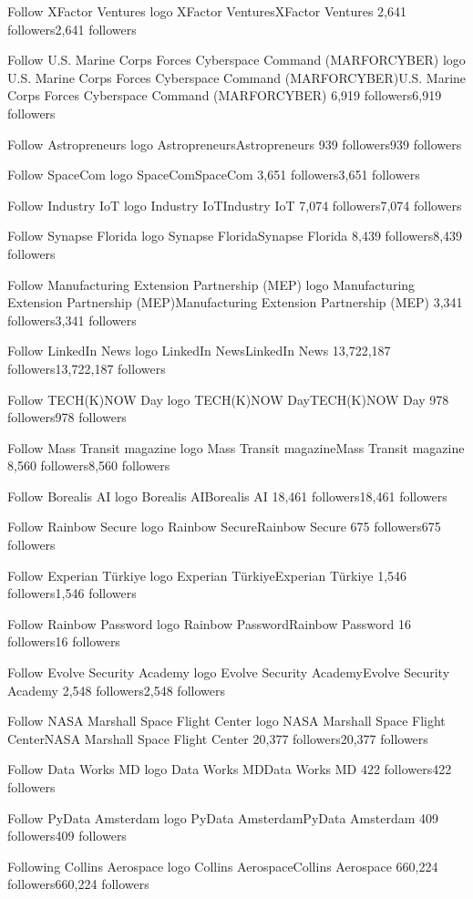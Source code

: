 Follow
XFactor Ventures logo
XFactor VenturesXFactor Ventures
2,641 followers2,641 followers

Follow
U.S. Marine Corps Forces Cyberspace Command (MARFORCYBER) logo
U.S. Marine Corps Forces Cyberspace Command (MARFORCYBER)U.S. Marine Corps Forces Cyberspace Command (MARFORCYBER)
6,919 followers6,919 followers

Follow
Astropreneurs logo
AstropreneursAstropreneurs
939 followers939 followers

Follow
SpaceCom logo
SpaceComSpaceCom
3,651 followers3,651 followers

Follow
Industry IoT logo
Industry IoTIndustry IoT
7,074 followers7,074 followers

Follow
Synapse Florida logo
Synapse FloridaSynapse Florida
8,439 followers8,439 followers

Follow
Manufacturing Extension Partnership (MEP) logo
Manufacturing Extension Partnership (MEP)Manufacturing Extension Partnership (MEP)
3,341 followers3,341 followers

Follow
LinkedIn News logo
LinkedIn NewsLinkedIn News
13,722,187 followers13,722,187 followers

Follow
TECH(K)NOW Day logo
TECH(K)NOW DayTECH(K)NOW Day
978 followers978 followers

Follow
Mass Transit magazine logo
Mass Transit magazineMass Transit magazine
8,560 followers8,560 followers

Follow
Borealis AI logo
Borealis AIBorealis AI
18,461 followers18,461 followers

Follow
Rainbow Secure logo
Rainbow SecureRainbow Secure
675 followers675 followers

Follow
Experian Türkiye logo
Experian TürkiyeExperian Türkiye
1,546 followers1,546 followers

Follow
Rainbow Password logo
Rainbow PasswordRainbow Password
16 followers16 followers

Follow
Evolve Security Academy logo
Evolve Security AcademyEvolve Security Academy
2,548 followers2,548 followers

Follow
NASA Marshall Space Flight Center logo
NASA Marshall Space Flight CenterNASA Marshall Space Flight Center
20,377 followers20,377 followers

Follow
Data Works MD logo
Data Works MDData Works MD
422 followers422 followers

Follow
PyData Amsterdam logo
PyData AmsterdamPyData Amsterdam
409 followers409 followers

Following
Collins Aerospace logo
Collins AerospaceCollins Aerospace
660,224 followers660,224 followers

